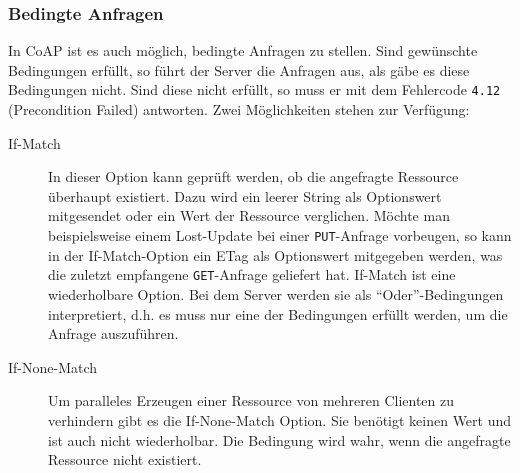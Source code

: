 \subsubsection{Bedingte Anfragen}
\label{option:ifmatch}
In \ac{CoAP} ist es auch möglich, bedingte Anfragen zu stellen. Sind gewünschte
Bedingungen erfüllt, so führt der Server die Anfragen aus, als gäbe es
diese Bedingungen nicht. Sind diese nicht erfüllt, so muss er mit dem
Fehlercode \verb!4.12! (Precondition Failed) antworten.
Zwei Möglichkeiten stehen zur Verfügung:
\begin{description}
\item[If-Match] In dieser Option kann geprüft
werden, ob die angefragte Ressource überhaupt existiert. Dazu wird ein leerer
String als Optionswert mitgesendet oder ein Wert der Ressource verglichen.
Möchte man beispielsweise einem Lost-Update bei einer \verb!PUT!-Anfrage
vorbeugen, so kann in der If-Match-Option ein ETag als Optionswert mitgegeben
werden, was die zuletzt empfangene \verb!GET!-Anfrage geliefert hat. If-Match ist eine
wiederholbare Option. Bei dem Server werden sie als "`Oder"'-Bedingungen
interpretiert, d.h. es muss nur eine der Bedingungen erfüllt werden, um die
Anfrage auszuführen.

\item[If-None-Match] Um paralleles Erzeugen einer Ressource von mehreren Clienten zu
verhindern gibt es die If-None-Match Option. Sie benötigt keinen Wert und ist
auch nicht wiederholbar. Die Bedingung wird wahr, wenn die angefragte Ressource
nicht existiert.
\end{description}